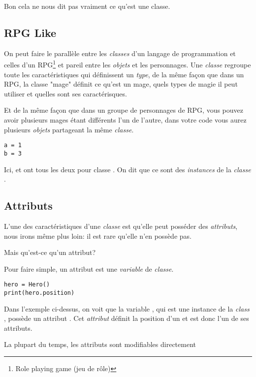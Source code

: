 Bon cela ne nous dit pas vraiment ce qu'est une classe.

\subsection{RPG Like}

On peut faire le parallèle entre les \emph{classes} d'un langage de programmation et celles d'un RPG\footnote{Role playing game (jeu de rôle)} et pareil entre les \emph{objets} et les personnages.
Une \emph{classe} regroupe toute les caractéristiques qui définissent un \emph{type}, de la même façon que dans un RPG, la classe "mage" définit ce qu'est un mage, quels types de magie il peut utiliser et quelles sont ses caractérisques.

Et de la même façon que dans un groupe de personnages de RPG, vous pouvez avoir plusieurs mages étant différents l'un de l'autre, dans votre code vous aurez plusieurs \emph{objets} partageant la même \emph{classe}.

\begin{lstlisting}
a = 1
b = 3
\end{lstlisting}

Ici,  et  ont tous les deux pour classe .
On dit que ce sont des \emph{instances} de la \emph{classe} .

\subsection{Attributs}

L'une des caractéristiques d'une \emph{classe} est qu'elle peut posséder des \emph{attributs}, nous irons même plus loin: il est rare qu'elle n'en possède pas.

Mais qu'est-ce qu'un attribut?

Pour faire simple, un attribut est une \emph{variable} de \emph{classe}.

\begin{lstlisting}
hero = Hero()
print(hero.position) 
\end{lstlisting}

Dans l'exemple ci-dessus, on voit que la variable , qui est une instance de la \emph{class} , possède un attribut . Cet \emph{attribut} définit la position d'un  et est donc l'un de ses attributs.

La plupart du temps, les attributs sont modifiables directement  

